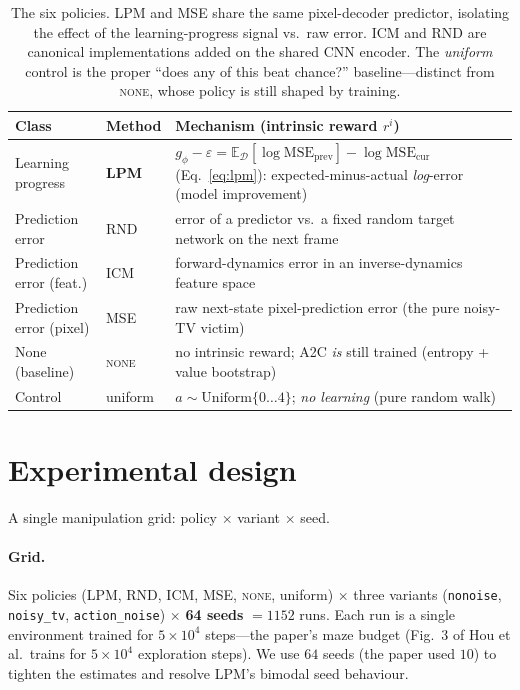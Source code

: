 \documentclass[11pt]{article}
\begin{document}
\begin{table}[h]
\centering
\begin{tabular}{@{}llp{6.4cm}@{}}
\toprule
\textbf{Class} & \textbf{Method} & \textbf{Mechanism (intrinsic reward $r^{i}$)} \\
\midrule
Learning progress        & \textbf{LPM} & $g_\phi-\varepsilon=\mathbb{E}_{\mathcal D}[\log\mathrm{MSE}_{\text{prev}}]-\log\mathrm{MSE}_{\text{cur}}$ (Eq.~\ref{eq:lpm}): expected-minus-actual \emph{log}-error (model improvement) \\
Prediction error         & RND          & error of a predictor vs.\ a fixed random target network on the next frame \\
Prediction error (feat.) & ICM          & forward-dynamics error in an inverse-dynamics feature space \\
Prediction error (pixel) & MSE          & raw next-state pixel-prediction error (the pure noisy-TV victim) \\
None (baseline)          & \textsc{none}& no intrinsic reward; A2C \emph{is} still trained (entropy + value bootstrap) \\
Control                  & uniform      & $a\sim\mathrm{Uniform}\{0\dots4\}$; \emph{no learning} (pure random walk) \\
\bottomrule
\end{tabular}
\caption{The six policies. LPM and MSE share the same pixel-decoder predictor, isolating the effect
of the learning-progress signal vs.\ raw error. ICM and RND are canonical implementations added on
the shared CNN encoder. The \emph{uniform} control is the proper ``does any of this beat chance?''
baseline---distinct from \textsc{none}, whose policy is still shaped by training.}
\end{table}

\section{Experimental design}
A single manipulation grid: policy $\times$ variant $\times$ seed.

\paragraph{Grid.} Six policies (LPM, RND, ICM, MSE, \textsc{none}, uniform) $\times$ three variants
(\texttt{nonoise}, \texttt{noisy\_tv}, \texttt{action\_noise}) $\times$ \textbf{64 seeds} $=1152$
runs. Each run is a single environment trained for $5\times10^{4}$ steps---the paper's maze budget
(Fig.~3 of Hou et al.\ trains for $5\times10^{4}$ exploration steps). We use $64$ seeds (the paper
used $10$) to tighten the estimates and resolve LPM's bimodal seed behaviour.
\end{document}
